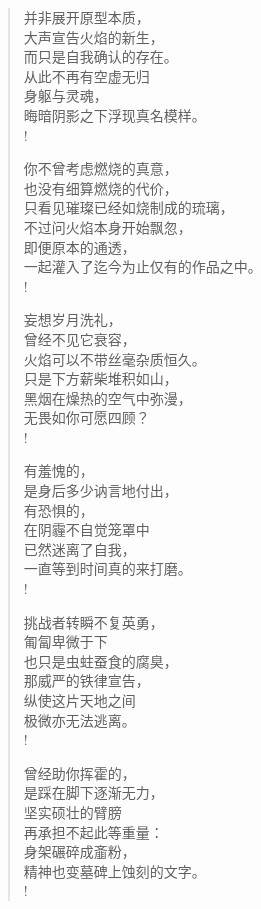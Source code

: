 \documentclass[UTF8, 12pt, a4paper]{ctexrep} %
\begin{document}
\begin{verse}
    并非展开原型本质，\\
    大声宣告火焰的新生，\\
    而只是自我确认的存在。\\
    从此不再有空虚无归\\
    身躯与灵魂，\\
    晦暗阴影之下浮现真名模样。\\!
    
    你不曾考虑燃烧的真意，\\
    也没有细算燃烧的代价，\\
    只看见璀璨已经如烧制成的琉璃，\\
    不过问火焰本身开始飘忽，\\
    即便原本的通透，\\
    一起灌入了迄今为止仅有的作品之中。\\!

    妄想岁月洗礼，\\
    曾经不见它衰容，\\
    火焰可以不带丝毫杂质恒久。\\
    只是下方薪柴堆积如山，\\
    黑烟在燥热的空气中弥漫，\\
    无畏如你可愿四顾？\\!

    有羞愧的，\\
    是身后多少讷言地付出，\\
    有恐惧的，\\
    在阴霾不自觉笼罩中\\
    已然迷离了自我，\\
    一直等到时间真的来打磨。\\!

    挑战者转瞬不复英勇，\\
    匍匐卑微于下\\
    也只是虫蛀蚕食的腐臭，\\
    那威严的铁律宣告，\\
    纵使这片天地之间\\
    极微亦无法逃离。\\!

    曾经助你挥霍的，\\
    是踩在脚下逐渐无力，\\
    坚实硕壮的臂膀\\
    再承担不起此等重量：\\
    身架碾碎成齑粉，\\
    精神也变墓碑上蚀刻的文字。\\!


\end{verse}
\end{document}
